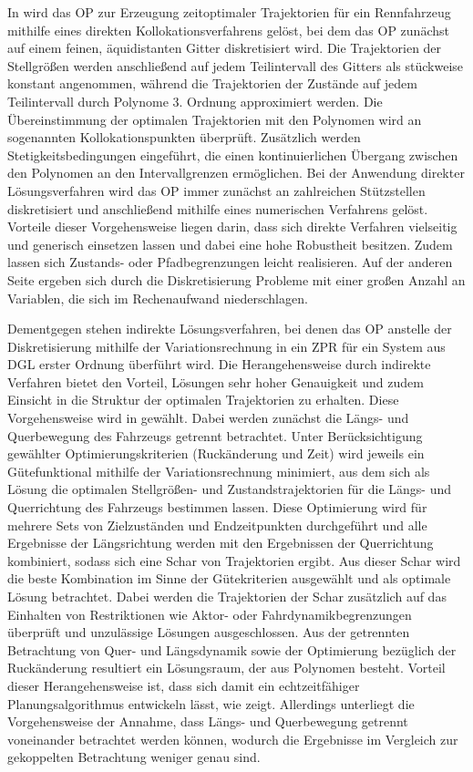 In \cite{Christ.2021} wird das \gls{OP} zur Erzeugung zeitoptimaler Trajektorien für ein Rennfahrzeug mithilfe eines direkten Kollokationsverfahrens gelöst, bei dem das \gls{OP} zunächst auf einem feinen, äquidistanten Gitter diskretisiert wird. Die Trajektorien der Stellgrößen werden anschließend auf jedem Teilintervall des Gitters als stückweise konstant angenommen, während die Trajektorien der Zustände auf jedem Teilintervall durch Polynome 3. Ordnung approximiert werden. Die Übereinstimmung der optimalen Trajektorien mit den Polynomen wird an sogenannten Kollokationspunkten überprüft. Zusätzlich werden Stetigkeitsbedingungen eingeführt, die einen kontinuierlichen Übergang zwischen den Polynomen an den Intervallgrenzen ermöglichen. Bei der Anwendung direkter Lösungsverfahren wird das \gls{OP} immer zunächst an zahlreichen Stützstellen diskretisiert und anschließend mithilfe eines numerischen Verfahrens gelöst. Vorteile dieser Vorgehensweise liegen darin, dass sich direkte Verfahren vielseitig und generisch einsetzen lassen und dabei eine hohe Robustheit besitzen. Zudem lassen sich Zustands- oder Pfadbegrenzungen leicht realisieren. Auf der anderen Seite ergeben sich durch die Diskretisierung Probleme mit einer großen Anzahl an Variablen, die sich im Rechenaufwand niederschlagen. 

Dementgegen stehen indirekte Lösungsverfahren, bei denen das \gls{OP} anstelle der Diskretisierung mithilfe der Variationsrechnung in ein \gls{ZPR} für ein System aus \gls{DGL} erster Ordnung überführt wird. Die Herangehensweise durch indirekte Verfahren bietet den Vorteil, Lösungen sehr hoher Genauigkeit und zudem Einsicht in die Struktur der optimalen Trajektorien zu erhalten. Diese Vorgehensweise wird in \cite{Rathgeber.2016} gewählt. Dabei werden zunächst die Längs- und Querbewegung des Fahrzeugs getrennt betrachtet. Unter Berücksichtigung gewählter Optimierungskriterien (Ruckänderung und Zeit) wird jeweils ein Gütefunktional mithilfe der Variationsrechnung minimiert, aus dem sich als Lösung die optimalen Stellgrößen- und Zustandstrajektorien für die Längs- und Querrichtung des Fahrzeugs bestimmen lassen. Diese Optimierung wird für mehrere Sets von Zielzuständen und Endzeitpunkten durchgeführt und alle Ergebnisse der Längsrichtung werden mit den Ergebnissen der Querrichtung kombiniert, sodass sich eine Schar von Trajektorien ergibt. Aus dieser Schar wird die beste Kombination im Sinne der Gütekriterien ausgewählt und als optimale Lösung betrachtet. Dabei werden die Trajektorien der Schar zusätzlich auf das Einhalten von Restriktionen wie Aktor- oder Fahrdynamikbegrenzungen überprüft und unzulässige Lösungen ausgeschlossen. Aus der getrennten Betrachtung von Quer- und Längsdynamik sowie der Optimierung bezüglich der Ruckänderung resultiert ein Lösungsraum, der aus Polynomen besteht. Vorteil dieser Herangehensweise ist, dass sich damit ein echtzeitfähiger Planungsalgorithmus entwickeln lässt, wie \cite{Rathgeber.2016} zeigt. Allerdings unterliegt die Vorgehensweise der Annahme, dass Längs- und Querbewegung getrennt voneinander betrachtet werden können, wodurch die Ergebnisse im Vergleich zur gekoppelten Betrachtung weniger genau sind. 


